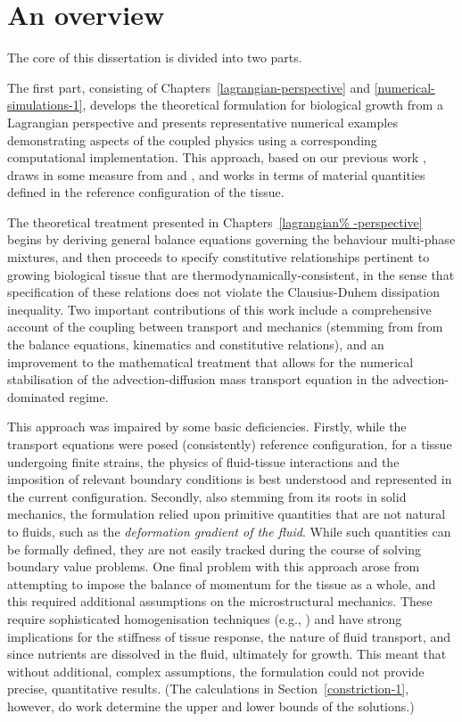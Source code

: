 \section{An overview}
\label{overview}

The core of this dissertation is divided into two parts.

The first part, consisting of Chapters~\ref{lagrangian-perspective}
and \ref{numerical-simulations-1}, develops the theoretical
formulation for biological growth from a Lagrangian perspective and
presents representative numerical examples demonstrating aspects of
the coupled physics using a corresponding computational
implementation. This approach, based on our previous work
\citep{growthpaper}, draws in some measure from
\citet{CowinHegedus:76, EpsteinMaugin:2000} and
\citet{TaberHumphrey:2001}, and works in terms of material quantities
defined in the reference configuration of the tissue.

The theoretical treatment presented in Chapters~\ref{lagrangian%
  -perspective} begins by deriving general balance equations governing
the behaviour multi-phase mixtures, and then proceeds to specify
constitutive relationships pertinent to growing biological tissue that
are thermody\-namically-consistent, in the sense that specification of
these relations does not violate the Clausius-Duhem dissipation
inequality. Two important contributions of this work include a
comprehensive account of the coupling between transport and mechanics
(stemming from from the balance equations, kinematics and constitutive
relations), and an improvement to the mathematical treatment that
allows for the numerical stabilisation of the advection-diffusion mass
transport equation in the advection-dominated regime.

This approach was impaired by some basic deficiencies. Firstly, while
the transport equations were posed (consistently) reference
configuration, for a tissue undergoing finite strains, the physics of
fluid-tissue interactions and the imposition of relevant boundary
conditions is best understood and represented in the current
configuration.
Secondly, also stemming from its 
roots in solid mechanics, the formulation relied upon primitive
quantities that are not natural to fluids, such as the {\em
  deformation gradient of the fluid}. While such quantities can be
formally defined, they are not easily tracked during the course of
solving boundary value problems. One final problem with this approach
arose from attempting to impose the balance of momentum for the tissue
as a whole, and this required additional assumptions on the
microstructural mechanics. These require sophisticated homogenisation
techniques (e.g., \citet{IdiartCastaneda:2003}) and have strong implications
for the stiffness of tissue response, the nature of fluid transport,
and since nutrients are dissolved in the fluid, ultimately for
growth. This meant that without additional, complex assumptions, the
formulation could not provide precise, quantitative results. (The calculations in
Section~\ref{constriction-1}, however, do work determine the upper and
lower bounds of the solutions.)

